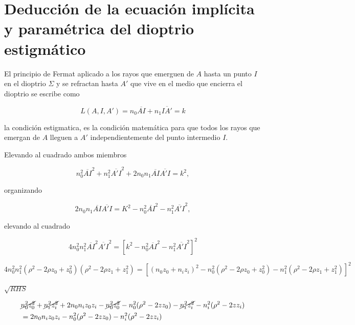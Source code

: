 \section{Deducción de la ecuación implícita y paramétrica del dioptrio estigmático}



El principio de Fermat aplicado a los rayos que emerguen de $A$ hasta un punto $I$ en el dioptrio $\Sigma$ y se refractan hasta $A'$ que vive en el medio que encierra el dioptrio se escribe como

\begin{equation}
    L(A, I, A') = n_0 \overline{AI} + n_1 \overline{IA'} = k
    \label{eq:fermat_principle_for_dioptrique}
\end{equation}

la condición estigmatica, es la condición matemática para que todos los rayos que emergan de $A$ lleguen a $A'$ independientemente del punto intermedio $I$. 


Elevando al cuadrado ambos miembros 

\begin{equation}
n_0^2 \overline{AI}^2 + n_1^2 \overline{A'I}^2 + 2n_0n_1 \overline{AI} \overline{A'I} = k^2, 
\end{equation}

organizando 

\begin{equation}
2n_0n_1 \overline{AI} \overline{A'I} = K^2 - n_0^2\overline{AI}^2 - n_1^2\overline{A'I}^2, 
\end{equation}

elevando al cuadrado 

\begin{equation}
4n_0^2n_1^2 \overline{AI}^2 \overline{A'I}^2 = [k^2 - n_0^2\overline{AI}^2 - n_1^2\overline{A'I}^2]^2
\end{equation}

\begin{equation}
4n_0^2n_1^2 (\rho^2 - 2\rho z_0 + z_0^2) (\rho^2 - 2\rho z_1 + z_1^2) = [(n_0z_0 + n_iz_i)^2 - n_0^2(\rho^2 - 2\rho z_0 + z_0^2) - n_1^2(\rho^2 - 2\rho z_1 + z_1^2)]^2
\end{equation}



$\sqrt{RHS}$


\begin{equation}
\begin{aligned}
&\cancel{n_0^2z_0^2} + \cancel{n_i^2z_i^2} + 2n_0n_iz_0z_i 
- \cancel{n_0^2z_0^2} - n_0^2(\rho^2 - 2zz_0) 
- \cancel{n_i^2z_i^2} - n_i^2(\rho^2 - 2zz_i) \\
&= 2n_0n_iz_0z_i - n_0^2(\rho^2 - 2zz_0) - n_i^2(\rho^2 - 2zz_i)
\end{aligned}
\end{equation}

